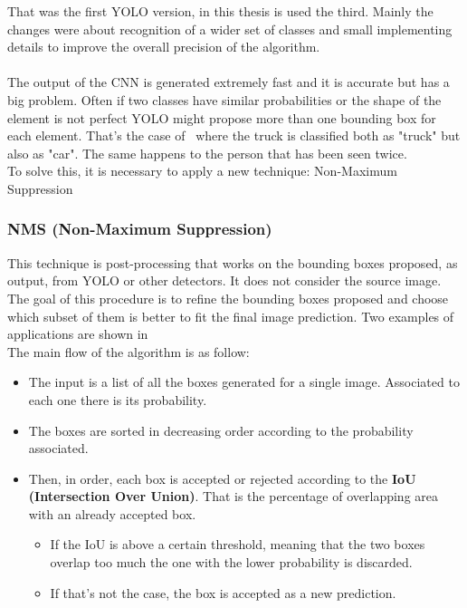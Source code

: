 That was the first YOLO version, in this thesis is used the third\cite{yoloV3}. Mainly the changes were about recognition of a wider set of classes and small implementing details to improve the overall precision of the algorithm.\\
\\
The output of the CNN is generated extremely fast and it is accurate but has a big problem. Often if two classes have similar probabilities or the shape of the element is not perfect YOLO might propose more than one bounding box for each element. That's the case of~ where the truck is classified both as "truck" but also as "car". The same happens to the person that has been seen twice.\\
To solve this, it is necessary to apply a new technique: Non-Maximum Suppression

\subsubsection*{NMS (Non-Maximum Suppression)}
This technique\cite{nms} is post-processing that works on the bounding boxes proposed, as output, from YOLO or other detectors. It does not consider the source image. The goal of this procedure is to refine the bounding boxes proposed and choose which subset of them is better to fit the final image prediction. Two examples of applications are shown in~\\
The main flow of the algorithm is as follow:
\begin{itemize}
	\item The input is a list of all the boxes generated for a single image. Associated to each one there is its probability.
	\item The boxes are sorted in decreasing order according to the probability associated.
	\item Then, in order, each box is accepted or rejected according to the \textbf{IoU (Intersection Over Union)}. That is the percentage of overlapping area with an already accepted box.
	\begin{itemize}
		\item If the IoU is above a certain threshold, meaning that the two boxes overlap too much the one with the lower probability is discarded.
		\item If that's not the case, the box is accepted as a new prediction.
	\end{itemize}
\end{itemize}

